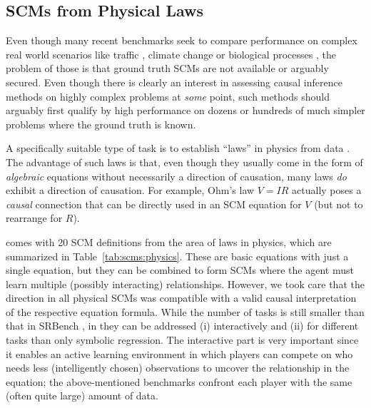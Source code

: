 \subsection{SCMs from Physical Laws}
Even though many recent benchmarks seek to compare performance on complex real world scenarios like traffic \citep{chengcausaltime}, climate change \citep{runge2019causality} or biological processes \citep{chevalley2023causalbench}, the problem of those is that ground truth SCMs are not available or arguably secured.
Even though there is clearly an interest in assessing causal inference methods on highly complex problems at \emph{some} point, such methods should arguably first qualify by high performance on dozens or hundreds of much simpler problems where the ground truth is known.

A specifically suitable type of task is to establish ``laws'' in physics from data  \citep{olson2017pmlb,la2021contemporary,romano2021pmlb}.
The advantage of such laws is that, even though they usually come in the form of \emph{algebraic} equations without necessarily a direction of causation, many laws \emph{do} exhibit a direction of causation.
For example, Ohm's law $V = IR$ actually poses a \emph{causal} connection that can be directly used in an SCM equation for $V$ (but not to rearrange for $R$).

\package comes with 20 SCM definitions from the area of laws in physics, which are summarized in Table~\ref{tab:scms:physics}.
These are basic equations with just a single equation, but they can be combined to form SCMs where the agent must learn multiple (possibly interacting) relationships. 
However, we took care that the direction in all physical SCMs was compatible with a valid causal interpretation of the respective equation formula.
While the number of tasks is still smaller than that in SRBench \citep{la2021contemporary}, in \package they can be addressed (i) interactively and (ii) for different tasks than only symbolic regression.
The interactive part is very important since it enables an active learning environment in which players can compete on who needs less (intelligently chosen) observations to uncover the relationship in the equation; the above-mentioned benchmarks confront each player with the same (often quite large) amount of data.

\begin{table}[h!]
    \centering
    \resizebox{\textwidth}{!}{
        
    }

    \caption{The 20 causally interpreted laws in \package to define SCMs.}
    \label{tab:scms:physics}
\end{table}

